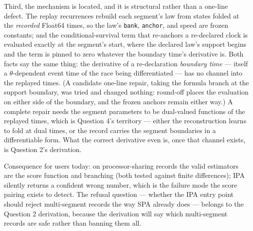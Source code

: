 \documentclass[11pt]{article}
\newcommand{\code}[1]{\texttt{#1}}
\begin{document}
Third, the mechanism is located, and it is structural rather than a
one-line defect. The replay recurrences rebuild each segment's law from
states folded at the \emph{recorded} Float64 times, so the law's
\code{bank}, \code{anchor}, and speed are frozen constants; and the
conditional-survival term that re-anchors a re-declared clock is
evaluated exactly at the segment's start, where the declared law's
support begins and the term is pinned to zero whatever the boundary
time's derivative is. Both facts say the same thing: the derivative of a
re-declaration \emph{boundary time} --- itself a $\theta$-dependent event
time of the race being differentiated --- has no channel into the
replayed times. (A candidate one-line repair, taking the formula branch
at the support boundary, was tried and changed nothing: round-off places
the evaluation on either side of the boundary, and the frozen anchors
remain either way.) A complete repair needs the segment parameters to be
dual-valued functions of the replayed times, which is Question 4's
territory --- either the reconstruction learns to fold at dual times, or
the record carries the segment boundaries in a differentiable form. What
the correct derivative even is, once that channel exists, is Question 2's
derivation.

Consequence for users today: on processor-sharing records the valid
estimators are the score function and branching (both tested against
finite differences); IPA silently returns a confident wrong number, which
is the failure mode the score pairing exists to detect. The refusal
question --- whether the IPA entry point should reject multi-segment
records the way SPA already does --- belongs to the Question 2 derivation,
because the derivation will say which multi-segment records are safe
rather than banning them all.
\end{document}
